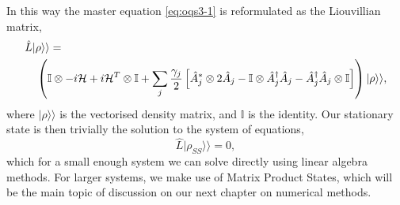 In this way the master equation \cref{eq:oqs3-1} is reformulated as the Liouvillian matrix,
 \begin{align}
 	&\hat{L}|\rho \rangle \rangle = \notag \\ 
 	&\quad \left( \mathbb{I} \otimes -i\mathcal{H} + i\mathcal{H}^{T} \otimes \mathbb{I} + \sum_{j} \frac{\gamma_{j}}{2} \left[ \hat{A}_{j}^{*} \otimes 2\hat{A}_{j} - \mathbb{I} \otimes \hat{A}_{j}^{\dagger}\hat{A}_{j} - \hat{A}_{j}^{\dagger}\hat{A}_{j} \otimes \mathbb{I} \right]\right)|\rho\rangle\rangle,
 	\label{eq:oqs4-3}
 \end{align}
 where \(|\rho \rangle\rangle\) is the vectorised density matrix, and \(\mathbb{I}\) is the identity. Our stationary state is then trivially the solution to the system of equations,
 \begin{equation}
 	\hat{L} |\rho_{SS} \rangle\rangle = 0,
 	\label{eq:oqs4-4}
 \end{equation}
 which for a small enough system we can solve directly using linear algebra methods. For larger systems, we make use of Matrix Product States, which will be the main topic of discussion on our next chapter on numerical methods.
